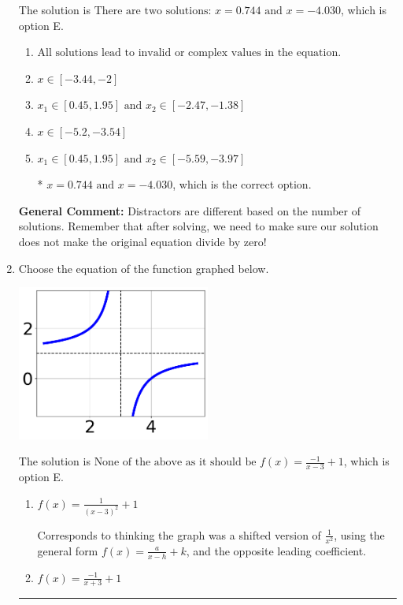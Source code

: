 \documentclass{extbook}[14pt]
\newcommand{\litem}[1]{\item #1

\rule{\textwidth}{0.4pt}}
\begin{document}
\begin{enumerate}
{The solution is \( \text{There are two solutions: } x = 0.744 \text{ and } x = -4.030 \), which is option E.\begin{enumerate}[label=\Alph*.]
\item \( \text{All solutions lead to invalid or complex values in the equation.} \)


\item \( x \in [-3.44,-2] \)


\item \( x_1 \in [0.45, 1.95] \text{ and } x_2 \in [-2.47,-1.38] \)


\item \( x \in [-5.2,-3.54] \)


\item \( x_1 \in [0.45, 1.95] \text{ and } x_2 \in [-5.59,-3.97] \)

* $x = 0.744 \text{ and } x = -4.030$, which is the correct option.
\end{enumerate}

\textbf{General Comment:} Distractors are different based on the number of solutions. Remember that after solving, we need to make sure our solution does not make the original equation divide by zero!
}
\litem{
Choose the equation of the function graphed below.

\begin{center}
    \includegraphics[width=0.5\textwidth]{../Figures/rationalGraphToEquationCopyA.png}
\end{center}




The solution is \( \text{None of the above as it should be } f(x) = \frac{-1}{x - 3} + 1 \), which is option E.\begin{enumerate}[label=\Alph*.]
\item \( f(x) = \frac{1}{(x - 3)^2} + 1 \)

Corresponds to thinking the graph was a shifted version of $\frac{1}{x^2}$, using the general form $f(x) = \frac{a}{x-h}+k$, and the opposite leading coefficient.
\item \( f(x) = \frac{-1}{x + 3} + 1 \)


\end{enumerate}}
\end{enumerate}
\end{document}
